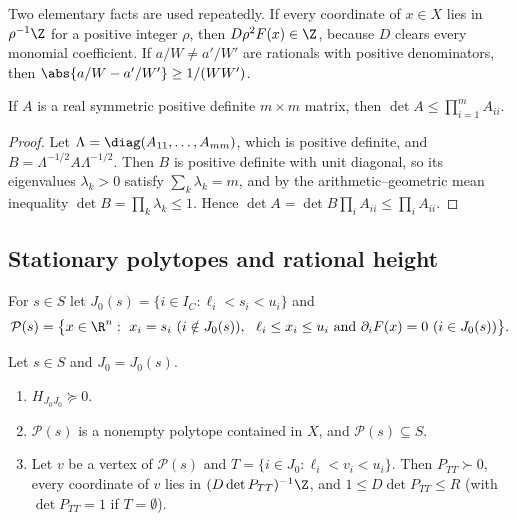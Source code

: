 Two elementary facts are used repeatedly. If every coordinate of $x\in X$
lies in $\rho^{-1}\Z$ for a positive integer $\rho$, then
$D\rho^2F(x)\in\Z$, because $D$ clears every monomial coefficient. If
$a/W\ne a'/W'$ are rationals with positive denominators, then
$\abs{a/W-a'/W'}\ge1/(WW')$.

\begin{lemma}\label{lem:hadamard}
If $A$ is a real symmetric positive definite $m\times m$ matrix, then
$\det A\le\prod_{i=1}^mA_{ii}$.
\end{lemma}

\begin{proof}
Let $\Lambda=\diag(A_{11},\dots,A_{mm})$, which is positive definite, and
$B=\Lambda^{-1/2}A\Lambda^{-1/2}$. Then $B$ is positive definite with unit
diagonal, so its eigenvalues $\lambda_k>0$ satisfy $\sum_k\lambda_k=m$, and
by the arithmetic--geometric mean inequality
$\det B=\prod_k\lambda_k\le1$. Hence
$\det A=\det B\prod_iA_{ii}\le\prod_iA_{ii}$.
\end{proof}

\subsection{Stationary polytopes and rational height}

\begin{definition}\label{def:statpoly}
For $s\in S$ let $J_0(s)=\{i\in I_C:\ell_i<s_i<u_i\}$ and
\[
\mathcal P(s)=\bigl\{x\in\R^n:\ x_i=s_i\ (i\notin J_0(s)),\ \
\ell_i\le x_i\le u_i\ \text{and}\ \partial_iF(x)=0\ (i\in J_0(s))\bigr\}.
\]
\end{definition}

\begin{lemma}[Stationary polytopes]\label{lem:statpoly}
Let $s\in S$ and $J_0=J_0(s)$.
\begin{enumerate}[label=(\alph*)]
\item $H_{J_0J_0}\succeq0$.
\item $\mathcal P(s)$ is a nonempty polytope contained in $X$, and
$\mathcal P(s)\subseteq S$.
\item Let $v$ be a vertex of $\mathcal P(s)$ and
$T=\{i\in J_0:\ell_i<v_i<u_i\}$. Then $P_{TT}\succ0$, every coordinate of $v$
lies in $(D\det P_{TT})^{-1}\Z$, and $1\le D\det P_{TT}\le R$ (with
$\det P_{TT}=1$ if $T=\emptyset$).
\end{enumerate}
\end{lemma}

